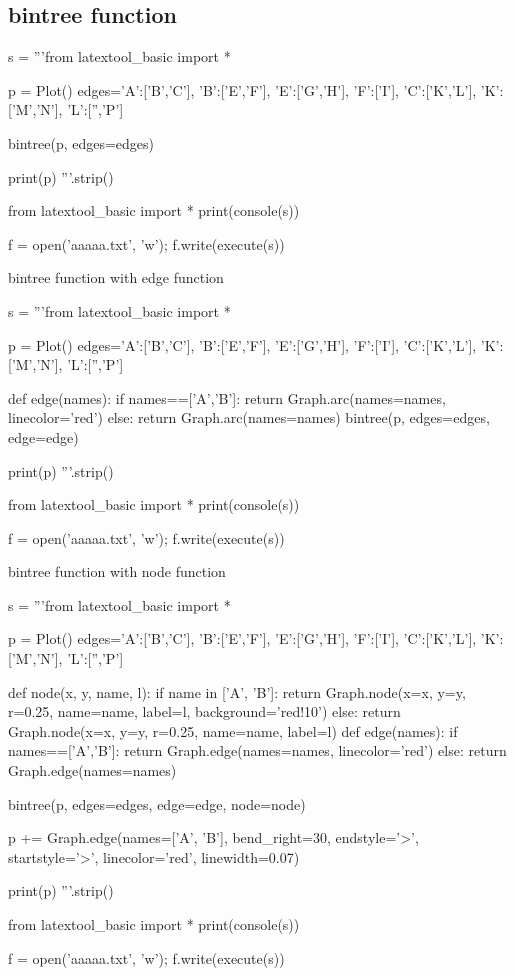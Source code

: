 \newpage
\subsection{bintree function}

\begin{python}
s = '''from latextool_basic import *

p = Plot()
edges={'A':['B','C'],
       'B':['E','F'],
       'E':['G','H'],
       'F':['I'],
       'C':['K','L'],
       'K':['M','N'],
       'L':['','P']}

bintree(p, edges=edges)

print(p)
'''.strip()

from latextool_basic import *
print(console(s))

f = open('aaaaa.txt', 'w'); f.write(execute(s))
\end{python}





\newpage
bintree function with edge function
\begin{python}
s = '''from latextool_basic import *

p = Plot()
edges={'A':['B','C'],
       'B':['E','F'],
       'E':['G','H'],
       'F':['I'],
       'C':['K','L'],
       'K':['M','N'],
       'L':['','P']}

def edge(names):
    if names==['A','B']:
        return Graph.arc(names=names, linecolor='red')
    else:
        return Graph.arc(names=names)
bintree(p, edges=edges, edge=edge)

print(p)
'''.strip()

from latextool_basic import *
print(console(s))

f = open('aaaaa.txt', 'w'); f.write(execute(s))
\end{python}




\newpage
bintree function with node function
\begin{python}
s = '''from latextool_basic import *

p = Plot()
edges={'A':['B','C'],
       'B':['E','F'],
       'E':['G','H'],
       'F':['I'],
       'C':['K','L'],
       'K':['M','N'],
       'L':['','P']}

def node(x, y, name, l):
    if name in ['A', 'B']:
        return Graph.node(x=x, y=y, r=0.25, name=name, label=l, background='red!10')
    else:
        return Graph.node(x=x, y=y, r=0.25, name=name, label=l)
def edge(names):
    if names==['A','B']:
        return Graph.edge(names=names, linecolor='red')
    else:
        return Graph.edge(names=names)

bintree(p, edges=edges, edge=edge, node=node)

p += Graph.edge(names=['A', 'B'],
     bend_right=30, 
     endstyle='>', startstyle='>', linecolor='red', linewidth=0.07)

print(p)
'''.strip()

from latextool_basic import *
print(console(s))

f = open('aaaaa.txt', 'w'); f.write(execute(s))
\end{python}






